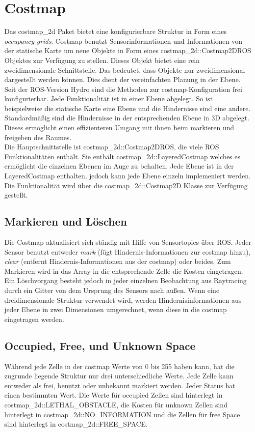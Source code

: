 \documentclass[oribibl]{llncs}
\begin{document}
\section{Costmap} \label{costmap}
Das costmap\_2d Paket \cite{costmap2d} bietet eine konfigurierbare Struktur in Form eines \textit{occupancy grids}. Costmap benutzt Sensorinformationen und Informationen von der statische Karte um neue Objekte in Form eines costmap\_2d::Costmap2DROS Objektes zur Verfügung zu stellen. Dieses Objekt bietet eine rein zweidimensionale Schnittstelle. Das bedeutet, dass Objekte nur zweidimensional dargestellt werden können. Dies dient der vereinfachten Planung in der Ebene.\\
Seit der ROS-Version Hydro sind die Methoden zur costmap-Konfiguration frei konfigurierbar. Jede Funktionalität ist in einer Ebene abgelegt. So ist beispielweise die statische Karte eine Ebene und die Hindernisse sind eine andere. Standardmäßig sind die Hindernisse in der entsprechenden Ebene in 3D abgelegt. Dieses ermöglicht einen effizienteren Umgang mit ihnen beim markieren und freigeben des Raumes.\\
Die Hauptschnittstelle ist costmap\_2d::Costmap2DROS, die viele ROS Funktionalitäten enthält. Sie enthält costmap\_2d::LayeredCostmap welches es ermöglicht die einzelnen Ebenen im Auge zu behalten. Jede Ebene ist in der LayeredCostmap enthalten, jedoch kann jede Ebene einzeln implemeniert werden. Die Funktionalität wird über die costmap\_2d::Costmap2D Klasse zur Verfügung gestellt.
\subsection{Markieren und Löschen}
Die Costmap aktualisiert sich ständig mit Hilfe von Sensortopics über ROS. Jeder Sensor benutzt entweder \textit{mark} (fügt Hindernis-Informationen zur costmap  hinzu), \textit{clear} (entfernt Hindernis-Informationen aus der costmap) oder beides. Zum Markieren wird in das Array in die entsprechende Zelle die Kosten eingetragen. Ein Löschvorgang besteht jedoch in jeder einzelnen Beobachtung aus Raytracing durch ein Gitter von dem Ursprung des Sensors nach außen. Wenn eine dreidimensionale Struktur verwendet wird, werden Hindernisinformationen aus jeder Ebene in zwei Dimensionen umgerechnet, wenn diese in die costmap eingetragen werden.\\
\subsection{Occupied, Free, und Unknown Space}
Während jede Zelle in der costmap Werte von 0 bis 255 haben kann, hat die zugrunde liegende Struktur nur drei unterschiedliche Werte. Jede Zelle kann entweder als frei, benutzt oder unbekannt markiert werden. Jeder Status hat einen bestimmten Wert. Die Werte für occupied Zellen sind hinterlegt in costmap\_2d::LETHAL\_OBSTACLE, die Kosten für unknown Zellen sind hinterlegt in costmap\_2d::NO\_INFORMATION und die Zellen für free Space sind hinterlegt in costmap\_2d::FREE\_SPACE.
\end{document}

